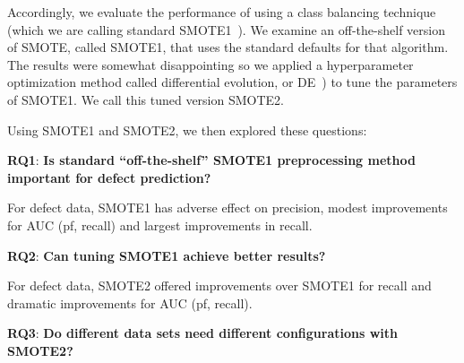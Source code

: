 \documentclass[sigconf,review, anonymous]{acmart}
\theoremstyle{break}
\theoremstyle{break}
\begin{document}

Accordingly,   we evaluate the performance of using a class balancing technique (which we are calling standard SMOTE1~\cite{chawla2002smote}).
We examine an off-the-shelf version
of SMOTE, called SMOTE1, that uses
the standard defaults for that algorithm. 
The results were somewhat disappointing
so we applied a hyperparameter optimization
method called differential evolution, or DE~\cite{storn1997differential}) to tune the parameters of SMOTE1. 
We call this tuned version SMOTE2.

Using SMOTE1 and SMOTE2, we then
explored  these  questions:  
 
  \textbf{RQ1}: \textbf{Is standard ``off-the-shelf'' SMOTE1 preprocessing method important for defect prediction?} 

 \begin{lesson}For defect data, SMOTE1 has adverse effect on 
 precision, modest improvements for AUC (pf, recall) and largest improvements in recall.
 \end{lesson}

 \textbf{RQ2}: \textbf{Can tuning SMOTE1  achieve better results?} 
 
 \begin{lesson}For defect data, SMOTE2  
 offered    improvements over SMOTE1 for recall
 and dramatic improvements for AUC (pf, recall).
 \end{lesson}
 
 \textbf{RQ3}: \textbf{Do different data sets
      need different configurations with SMOTE2?} 
 
\end{document}

